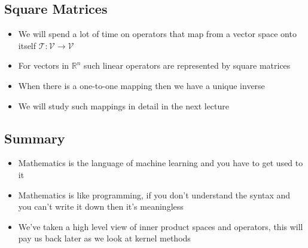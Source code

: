 
\begin{slide}
\section{Square Matrices}

\begin{PauseHighLight}
  \begin{itemize}
  \item We will spend a lot of time on operators that map from a vector
    space onto itself $\mathcal{T}: \mathcal{V}\rightarrow\mathcal{V}$\pause
  \item For vectors in $\mathbb{R}^n$ such linear operators are
    represented by square matrices\pause
  \item When there is a one-to-one mapping then we have a unique inverse\pause
  \item We will study such mappings in detail in the next lecture\pause
  \end{itemize}
\end{PauseHighLight}

\end{slide}


\begin{slide}
\section{Summary}

\begin{PauseHighLight}
  \begin{itemize}
  \item Mathematics is the language of machine learning and you have
    to get used to it\pause
  \item Mathematics is like programming, if you don't understand the
    syntax and you can't write it down then it's meaningless\pause
  \item We've taken a high level view of inner product spaces and
    operators, this will pay us back later as we look at kernel
    methods\pause
  \end{itemize}
\end{PauseHighLight}

\end{slide}





